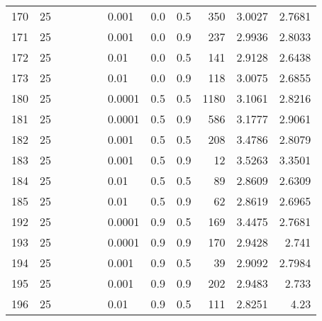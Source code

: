 \begin{longtable}{lrrrrrlrrrrr}
 170 &      25 &   &   &   &   &                       0.001 &  0.0 &    0.5 &     350 &                 3.0027 &                 2.7681 \\
 171 &      25 &   &   &   &   &                       0.001 &  0.0 &    0.9 &     237 &                 2.9936 &                 2.8033 \\
 172 &      25 &   &   &   &   &                        0.01 &  0.0 &    0.5 &     141 &                 2.9128 &                 2.6438 \\
 173 &      25 &   &   &   &   &                        0.01 &  0.0 &    0.9 &     118 &                 3.0075 &                 2.6855 \\
 180 &      25 &   &   &   &   &                      0.0001 &  0.5 &    0.5 &    1180 &                 3.1061 &                 2.8216 \\
 181 &      25 &   &   &   &   &                      0.0001 &  0.5 &    0.9 &     586 &                 3.1777 &                 2.9061 \\
 182 &      25 &   &   &   &   &                       0.001 &  0.5 &    0.5 &     208 &                 3.4786 &                 2.8079 \\
 183 &      25 &   &   &   &   &                       0.001 &  0.5 &    0.9 &      12 &                 3.5263 &                 3.3501 \\
 184 &      25 &   &   &   &   &                        0.01 &  0.5 &    0.5 &      89 &                 2.8609 &                 2.6309 \\
 185 &      25 &   &   &   &   &                        0.01 &  0.5 &    0.9 &      62 &                 2.8619 &                 2.6965 \\
 192 &      25 &   &   &   &   &                      0.0001 &  0.9 &    0.5 &     169 &                 3.4475 &                 2.7681 \\
 193 &      25 &   &   &   &   &                      0.0001 &  0.9 &    0.9 &     170 &                 2.9428 &                  2.741 \\
 194 &      25 &   &   &   &   &                       0.001 &  0.9 &    0.5 &      39 &                 2.9092 &                 2.7984 \\
 195 &      25 &   &   &   &   &                       0.001 &  0.9 &    0.9 &     202 &                 2.9483 &                  2.733 \\
 196 &      25 &   &   &   &   &                        0.01 &  0.9 &    0.5 &     111 &                 2.8251 &                   4.23 \\

\end{longtable}

